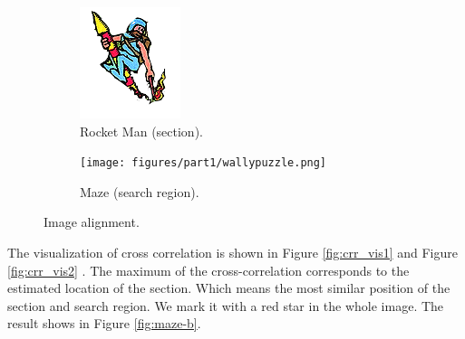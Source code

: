 \begin{figure}[h!]
	\centering
		\begin{subfigure}[t]{0.45\linewidth}
			\centering
			\includegraphics[width=0.6\linewidth]{figures/part1/wallypuzzle_rocketman.png}
			\caption{Rocket Man (section). }
			\label{fig:rocketman}
		\end{subfigure}
		\begin{subfigure}[t]{0.45\linewidth}
			\centering
			\texttt{[image: figures/part1/wallypuzzle.png]}
			\caption{Maze (search region). }
			\label{fig:maze-a}
		\end{subfigure}
		\caption{Image alignment.}
\end{figure} 

The visualization of cross correlation is shown in Figure \ref{fig:crr_vis1} and Figure \ref{fig:crr_vis2} . The maximum of the cross-correlation corresponds to the estimated location of the section. Which means the most similar position of the section and search region. We mark it with a red star in the whole image. The result shows in Figure \ref{fig:maze-b}.

